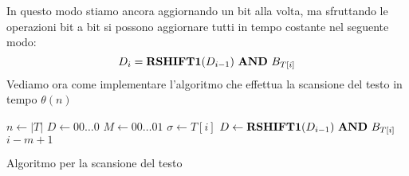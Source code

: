 In questo modo stiamo ancora aggiornando un bit alla volta, ma sfruttando le operazioni bit a bit si possono aggiornare tutti in tempo costante nel seguente modo:
\begin{equation}
    D_i = \text{\textbf{RSHIFT1}}(D_{i - 1}) \ \text{\textbf{AND}} \ B_{T[i]}
\end{equation}
Vediamo ora come implementare l'algoritmo che effettua la scansione del testo in tempo $\theta(n)$
\begin{algorithm}
  \begin{algorithmic}
        \State $n \gets |T|$
        \State $D \gets 00\dots0$
        \State $M \gets 00\dots01$
            \State $\sigma \gets T[i]$
            \State $D \gets \text{\textbf{RSHIFT1}}(D_{i - 1}) \ \text{\textbf{AND}} \ B_{T[i]}$
                \State {} $i - m + 1$
            \EndIf
        \EndFor
    \EndFunction
  \end{algorithmic}
  \caption{Algoritmo per la scansione del testo}
\end{algorithm}
